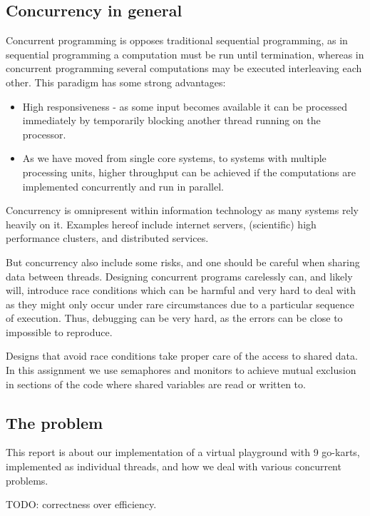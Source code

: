 
\subsection{Concurrency in general}
Concurrent programming is opposes traditional sequential programming, as in sequential programming a computation must be run until termination, whereas in concurrent programming several computations may be executed interleaving each other. This paradigm has some strong advantages:
\begin{itemize}
	\item High responsiveness - as some input becomes available it can be processed immediately by temporarily blocking another thread running on the processor.
	\item As we have moved from single core systems, to systems with multiple processing units, higher throughput can be achieved if the computations are implemented concurrently and run in parallel.
\end{itemize}

Concurrency is omnipresent within information technology as many systems rely heavily on it. Examples hereof include  internet servers, (scientific) high performance clusters, and distributed services.

But concurrency also include some risks, and one should be careful when sharing data between threads. Designing concurrent programs carelessly can, and likely will, introduce race conditions which can be harmful and very hard to deal with as they might only occur under rare circumstances due to a particular sequence of execution. Thus, debugging can be very hard, as the errors can be close to impossible to reproduce.

Designs that avoid race conditions take proper care of the access to shared data. In this assignment we use semaphores and monitors to achieve mutual exclusion in sections of the code where shared variables are read or written to.


\subsection{The problem}

This report is about our implementation of a virtual playground with 9 go-karts, implemented as individual threads, and how we deal with various concurrent problems.

TODO: correctness over efficiency.


